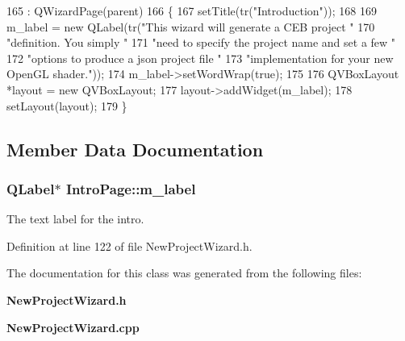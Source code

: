 \begin{DoxyCode}
165   : QWizardPage(parent)
166 \{
167   setTitle(tr(\textcolor{stringliteral}{"Introduction"}));
168 
169   m_label = \textcolor{keyword}{new} QLabel(tr(\textcolor{stringliteral}{"This wizard will generate a CEB project "}
170                           \textcolor{stringliteral}{"definition. You simply "}
171                           \textcolor{stringliteral}{"need to specify the project name and set a few "}
172                           \textcolor{stringliteral}{"options to produce a json project file "}
173                           \textcolor{stringliteral}{"implementation for your new OpenGL shader."}));
174   m_label->setWordWrap(\textcolor{keyword}{true});
175 
176   QVBoxLayout *layout = \textcolor{keyword}{new} QVBoxLayout;
177   layout->addWidget(m_label);
178   setLayout(layout);
179 \}
\end{DoxyCode}


\subsection{Member Data Documentation}
\subsubsection[{m\-\_\-label}]{\setlength{\rightskip}{0pt plus 5cm}Q\-Label$\ast$ Intro\-Page\-::m\-\_\-label\hspace{0.3cm}{\ttfamily [private]}}\label{class_intro_page_aac34d1db888c41e6f28c563049aaf071}


The text label for the intro. 



Definition at line 122 of file New\-Project\-Wizard.\-h.



The documentation for this class was generated from the following files\-:\begin{DoxyCompactItemize}
\item 
{\bf New\-Project\-Wizard.\-h}\item 
{\bf New\-Project\-Wizard.\-cpp}\end{DoxyCompactItemize}
